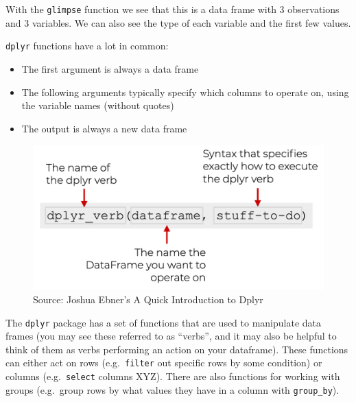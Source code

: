 \documentclass[
  letterpaper,
  DIV=11,
  numbers=noendperiod]{scrreprt}
\begin{document}
With the \texttt{glimpse} function we see that this is a data frame with
3 observations and 3 variables. We can also see the type of each
variable and the first few values.

\begin{tcolorbox}[enhanced jigsaw, bottomtitle=1mm, bottomrule=.15mm, toprule=.15mm, opacityback=0, leftrule=.75mm, breakable, colback=white, toptitle=1mm, left=2mm, coltitle=black, titlerule=0mm, opacitybacktitle=0.6, title=\textcolor{quarto-callout-tip-color}{\faLightbulb}\hspace{0.5em}{Tip}, rightrule=.15mm, arc=.35mm, colframe=quarto-callout-tip-color-frame, colbacktitle=quarto-callout-tip-color!10!white]

\texttt{dplyr} functions have a lot in common:

\begin{itemize}
\item
  The first argument is always a data frame
\item
  The following arguments typically specify which columns to operate on,
  using the variable names (without quotes)
\item
  The output is always a new data frame
\end{itemize}

\end{tcolorbox}

\begin{figure}[H]

{\centering \includegraphics[width=1\textwidth,height=\textheight]{scripts/03_dataWrangling/wrangling-files/dplyr_syntax.png}

}

\caption{Source: Joshua Ebner's A Quick Introduction to Dplyr}

\end{figure}%

The \texttt{dplyr} package has a set of functions that are used to
manipulate data frames (you may see these referred to as ``verbs'', and
it may also be helpful to think of them as verbs performing an action on
your dataframe). These functions can either act on rows
(e.g.~\texttt{filter} out specific rows by some condition) or columns
(e.g.~\texttt{select} columns XYZ). There are also functions for working
with groups (e.g.~group rows by what values they have in a column with
\texttt{group\_by}).
\end{document}

